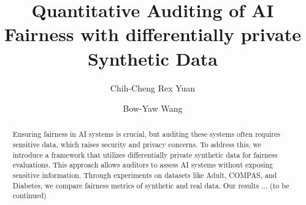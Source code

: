 \documentclass[manuscript,screen,review,anonymous]{acmart}
\begin{document}
\title{Quantitative Auditing of AI Fairness with differentially private Synthetic Data}

\author{Chih-Cheng Rex Yuan}

\author{Bow-Yaw Wang}


\begin{abstract}
Ensuring fairness in AI systems is crucial, but auditing these systems often requires sensitive data, which raises security and privacy concerns. To address this, we introduce a framework that utilizes differentially private synthetic data for fairness evaluations. This approach allows auditors to assess AI systems without exposing sensitive information. Through experiments on datasets like Adult, COMPAS, and Diabetes, we compare fairness metrics of synthetic and real data. Our results ... (to be continued)
\end{abstract}
\end{document}

